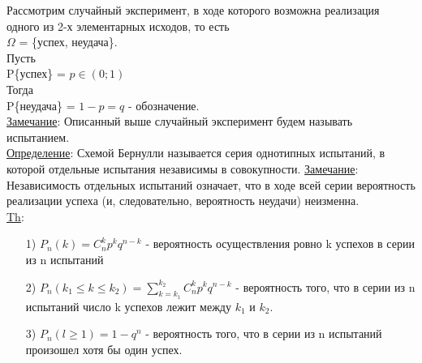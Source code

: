 
Рассмотрим случайный эксперимент, в ходе которого возможна реализация одного из 2-х элементарных исходов, то есть \\
$\Omega$ = \{успех, неудача\}. \\ %

Пусть \\
P\{успех\} = $p \in (0;1)$ \\
Тогда \\
P\{неудача\} = $1 - p = q$ - обозначение. \\
\underline{Замечание}: Описанный выше случайный эксперимент будем называть испытанием. \\


\underline{Определение}: Схемой Бернулли называется серия однотипных испытаний, в которой отдельные испытания независимы в совокупности.
\underline{Замечание}: Независимость отдельных испытаний означает, что в ходе всей серии вероятность реализации успеха (и, следовательно, вероятность неудачи) неизменна. \\


\underline{Th}: \\
\begin{enumerate}
\item[1)] $P_n(k) = C^k_n p^k q^{n - k}$ - вероятность осуществления ровно k успехов в серии из n испытаний \\

\item[2)] $P_n (k_1 \leqslant k \leqslant k_2) = \sum\limits_{k = k_1}^{k_2} C^k_n p^k q^{n - k}$ - вероятность того, что в серии из n испытаний число k успехов лежит между $k_1$ и $k_2$. \\

\item[3)] $P_n (l \geqslant 1) = 1 - q^n$ - вероятность того, что в серии из n испытаний произошел хотя бы один успех. \\
\end{enumerate}


